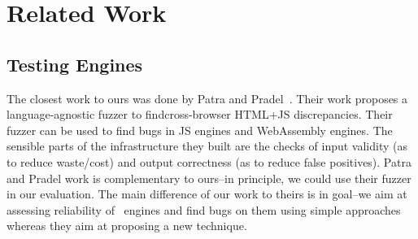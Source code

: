 \documentclass[10pt,conference,anonymous]{IEEEtran}
\begin{document}
% 

\section{Related Work}

\subsection{Testing \js{} Engines}
\label{sec:testing-js-engines}
The closest work to ours was done by Patra and
Pradel~\cite{patra2016learning}. Their work proposes a
language-agnostic fuzzer to findcross-browser HTML+JS
discrepancies. Their fuzzer can be used to find bugs in JS engines and
WebAssembly engines. The sensible parts of the infrastructure they
built are the checks of input validity (as to reduce waste/cost) and
output correctness (as to reduce false positives). Patra and Pradel
work is complementary to ours--in principle, we could use their fuzzer
in our evaluation. The main difference of our work to theirs is in
goal--we aim at assessing reliability of \js\ engines and find bugs on
them using simple approaches whereas they aim at proposing a new
technique.
\end{document}
